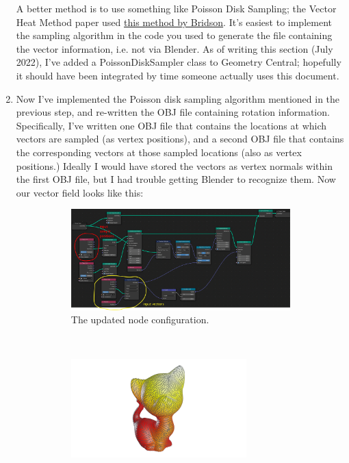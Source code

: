 \documentclass[10pt]{article}
\begin{document}
\begin{enumerate}
\begin{figure}[H]
        \label{fig:vector_instance_random-cull}
    \end{figure}
    A better method is to use something like Poisson Disk Sampling; the Vector Heat Method paper used \href{https://www.cs.ubc.ca/~rbridson/docs/bridson-siggraph07-poissondisk.pdf}{this method by Bridson}. It's easiest to implement the sampling algorithm in the code you used to generate the file containing the vector information, i.e. not via Blender. As of writing this section (July 2022), I've added a PoissonDiskSampler class to Geometry Central; hopefully it should have been integrated by time someone actually uses this document.
    \item Now I've implemented the Poisson disk sampling algorithm mentioned in the previous step, and re-written the OBJ file containing rotation information. Specifically, I've written one OBJ file that contains the locations at which vectors are sampled (as vertex positions), and a second OBJ file that contains the corresponding vectors at those sampled locations (also as vertex positions.) Ideally I would have stored the vectors as vertex normals within the first OBJ file, but I had trouble getting Blender to recognize them. Now our vector field looks like this:
    \begin{figure}[H]
        \centering
        \captionsetup{width=0.8\textwidth}
        \begin{subfigure}[b]{\textwidth}
         \centering
         \includegraphics[width=\textwidth]{images/vector_instance_sampled-nodes.png}
         \caption{The updated node configuration.}
        \end{subfigure} \\
        \begin{subfigure}[b]{\textwidth}
         \centering
         \includegraphics[width=0.8\textwidth]{images/vector_instance_poisson-sampled.png}

\end{subfigure}
\end{figure}
\end{enumerate}
\end{document}
